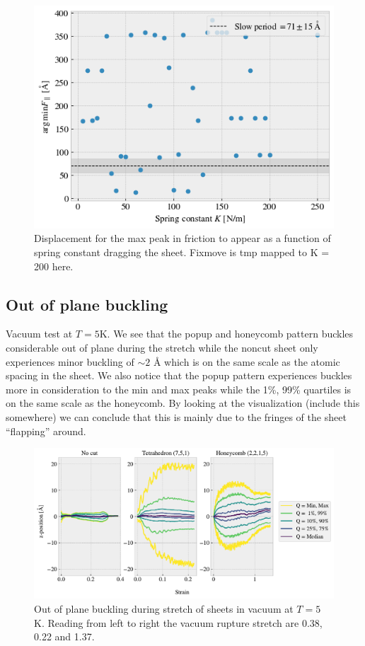 \begin{figure}[H]
  \centering
  \includegraphics[width=0.6\linewidth]{figures/baseline/max_vs_K}
  \caption{Displacement for the max peak in friction to appear as a function of spring constant dragging the sheet. Fixmove is tmp mapped to K = 200 here.}
  \label{fig:max_vs_K}
\end{figure}


\newpage

\subsection{Out of plane buckling}


Vacuum test at $T = 5$K. We see that the popup and honeycomb pattern buckles considerable out of plane during the stretch while the noncut sheet only experiences minor buckling of $\sim 2$ Å which is on the same scale as the atomic spacing in the sheet. We also notice that the popup pattern experiences buckles more in consideration to the min and max peaks while the 1\%, 99\% quartiles is on the same scale as the honeycomb. By looking at the visualization (include this somewhere) we can conclude that this is mainly due to the fringes of the sheet ``flapping'' around. 

\begin{figure}[H]
  \centering
  \includegraphics[width=\linewidth]{figures/baseline/vacuum_normal_buckling}
  \caption{Out of plane buckling during stretch of sheets in vacuum at $T = 5$ K. Reading from left to right the vacuum rupture stretch are 0.38, 0.22 and 1.37.}
  \label{fig:}
\end{figure}


